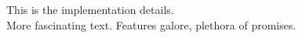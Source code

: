 This is the implementation details. \\

More fascinating text. Features galore, plethora of promises.\\